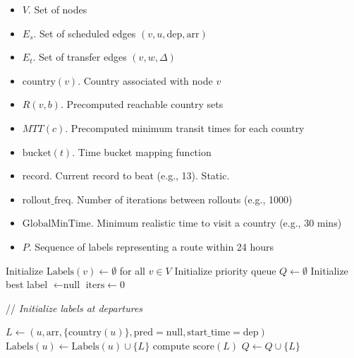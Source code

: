 \documentclass{article}
\newcommand{\CommentLine}[1]{
    \State // \textit{#1}
}
\begin{document}
\begin{algorithmic}[1] %
    
    \Input
    \begin{itemize}
        \item $V$. Set of nodes
        \item $E_s$. Set of scheduled edges $(v,u,\text{dep},\text{arr})$
        \item $E_t$. Set of transfer edges $(v,w,\Delta)$
        \item $\text{country}(v)$. Country associated with node $v$
        \item $R(v,b)$. Precomputed reachable country sets
        \item $MTT(c)$. Precomputed minimum transit times for each country
        \item $\text{bucket}(t)$. Time bucket mapping function
        \item $\text{record}$. Current record to beat (e.g., 13). Static.
        \item $\text{rollout\_freq}$. Number of iterations between rollouts (e.g., 1000)
        \item $\text{GlobalMinTime}$. Minimum realistic time to visit a country (e.g., 30 mins)
    \end{itemize}

    \Output
    \begin{itemize}
        \item $P$. Sequence of labels representing a route within 24 hours
    \end{itemize}
    \vspace{0.5em} 

    \State Initialize $\text{Labels}(v) \leftarrow \emptyset$ for all $v \in V$
    \State Initialize priority queue $Q \leftarrow \emptyset$ 
    \State Initialize best label $\leftarrow \text{null}$
    \State $\text{iters} \leftarrow 0$ 

    \vspace{0.5em}
    \CommentLine{Initialize labels at departures}
            \State $L \leftarrow (u,\text{arr},\{\text{country}(u)\},\text{pred}=\text{null},\text{start\_time}=\text{dep})$
            \State $\text{Labels}(u) \leftarrow \text{Labels}(u) \cup \{L\}$
            \State compute $\text{score}(L)$
            \State $Q \leftarrow Q \cup \{L\}$
        \EndFor
    \EndFor


\end{algorithmic}
\end{document}
